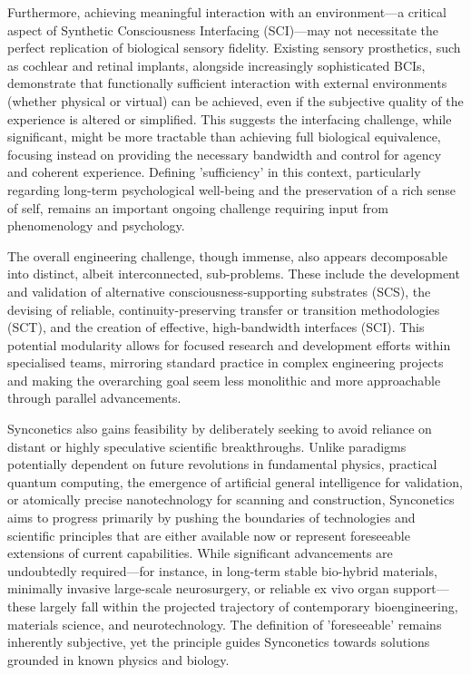 \documentclass[10pt]{article}
\begin{document}
\begin{sloppypar}
  Furthermore, achieving meaningful interaction with an environment—a critical aspect of Synthetic Consciousness Interfacing (SCI)—may not necessitate the perfect replication of biological sensory fidelity. Existing sensory prosthetics, such as cochlear and retinal implants, alongside increasingly sophisticated BCIs, demonstrate that functionally sufficient interaction with external environments (whether physical or virtual) can be achieved, even if the subjective quality of the experience is altered or simplified. This suggests the interfacing challenge, while significant, might be more tractable than achieving full biological equivalence, focusing instead on providing the necessary bandwidth and control for agency and coherent experience. Defining 'sufficiency' in this context, particularly regarding long-term psychological well-being and the preservation of a rich sense of self, remains an important ongoing challenge requiring input from phenomenology and psychology.

  The overall engineering challenge, though immense, also appears decomposable into distinct, albeit interconnected, sub-problems. These include the development and validation of alternative consciousness-supporting substrates (SCS), the devising of reliable, continuity-preserving transfer or transition methodologies (SCT), and the creation of effective, high-bandwidth interfaces (SCI). This potential modularity allows for focused research and development efforts within specialised teams, mirroring standard practice in complex engineering projects and making the overarching goal seem less monolithic and more approachable through parallel advancements.

  Synconetics also gains feasibility by deliberately seeking to avoid reliance on distant or highly speculative scientific breakthroughs. Unlike paradigms potentially dependent on future revolutions in fundamental physics, practical quantum computing, the emergence of artificial general intelligence for validation, or atomically precise nanotechnology for scanning and construction, Synconetics aims to progress primarily by pushing the boundaries of technologies and scientific principles that are either available now or represent foreseeable extensions of current capabilities. While significant advancements are undoubtedly required—for instance, in long-term stable bio-hybrid materials, minimally invasive large-scale neurosurgery, or reliable ex vivo organ support—these largely fall within the projected trajectory of contemporary bioengineering, materials science, and neurotechnology. The definition of 'foreseeable' remains inherently subjective, yet the principle guides Synconetics towards solutions grounded in known physics and biology.


\end{sloppypar}
\end{document}
